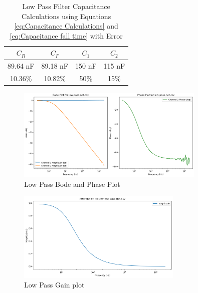 \documentclass{article}
\begin{document}
\begin{table}[h!]
    \centering
    \begin{tabular}{|c|c|c|c|}
        \hline
        $C_R$ & $C_F$ & $C_1$ & $C_2$\\
        \hline
        89.64 nF & 89.18 nF & 150 nF & 115 nF\\
        \hline
        10.36\% & 10.82\% & 50\% & 15\%\\
        \hline
    \end{tabular}
    \caption[Low Pass Filter Capacitance Calculations using Equations \ref{eq:Capacitance Calculations} and \ref{eq:Capacitance fall time} with Error]{Low Pass Filter Capacitance Calculations using Equations \ref{eq:Capacitance Calculations} and \ref{eq:Capacitance fall time} with Error\footnotemark}
    \label{tab:Low Pass Filter Capacitance Calculations}
\end{table}
\vspace{-3mm}
\begin{figure}[h!]
    \centering
    \includegraphics[width=0.8\textwidth]{Images/low-pass-bode.png}
    \caption{Low Pass Bode and Phase Plot}
    \label{fig:Low Pass Bode Plot}
\end{figure}
\vspace{-5mm}
\begin{figure}[H]
    \centering
    \includegraphics[width=0.7\textwidth]{Images/low-pass-gain.png}
    \caption{Low Pass Gain plot}
    \label{fig:Low Pass Gain plot}
\end{figure}
\vspace{-5mm}
\end{document}
